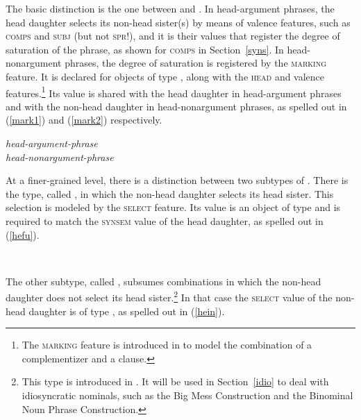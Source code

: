 \documentclass[output=paper
	        ,collection
	        ,collectionchapter
 	        ,biblatex
                ,babelshorthands
                ,newtxmath
                ,draftmode
                ,colorlinks, citecolor=brown
]{langscibook}
\begin{document}
The basic distinction is
the one between  and . 
In head-argument phrases, the head daughter selects its non-head sister(s) by means of 
valence features, such as \textsc{comps} and \textsc{subj} (but not \textsc{spr}!), 
and it is their values that register the degree of saturation of the phrase, 
as shown for \textsc{comps} in Section~\ref{syns}.  
In head-nonargument phrases, the degree of saturation is registered  
by the \textsc{marking} feature. It is declared for objects of type , 
along with the \textsc{head} and valence features.\footnote{The \textsc{marking} feature  
is introduced in \citet[46]{ps2} to model the combination of a complementizer 
and a clause.} Its value is shared with the head daughter in head-argument phrases
and with the non-head daughter in head-nonargument phrases, as spelled out in 
(\ref{mark1}) and (\ref{mark2}) respectively. 

\ea\label{mark1} 
\emph{head-argument-phrase} \impl \\
\z
\ea\label{mark2} 
\emph{head-nonargument-phrase} \impl \\
\z

\noindent
At a finer-grained level, there is a distinction between two subtypes of 
. There is the type, called ,  
in which the non-head daughter selects its head sister. This selection is modeled 
by the \textsc{select} feature. Its value is an object of type  and is 
required to match the \textsc{synsem} value of the head daughter, as spelled out 
in (\ref{hefu}).  

\begin{exe}
\ex\label{hefu} 
 \impl \\
\end{exe} 

\noindent
The other subtype, called , subsumes combinations in 
which the non-head daughter does not select its head sister.\footnote{This type is 
introduced in \citet[130]{VanEynde98a}. It will be used in Section~\ref{idio} to deal with 
idiosyncratic nominals, such as the Big Mess Construction and the Binominal Noun Phrase 
Construction.} In that case the \textsc{select} value of the non-head daughter is of type 
, as spelled out in (\ref{hein}). 
\end{document}
